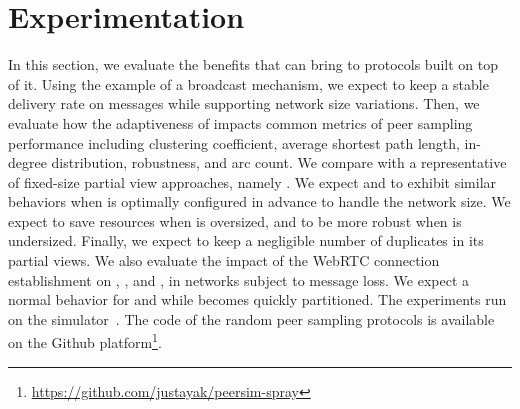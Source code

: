 \section{Experimentation}
\label{sec:experimentation}

In this section, we evaluate the benefits that \SPRAY can bring to
protocols built on top of it. Using the example of a broadcast
mechanism, we expect \SPRAY to keep a stable delivery rate on messages
while supporting network size variations. Then, we evaluate how the
adaptiveness of \SPRAY impacts common metrics of peer sampling
performance including clustering coefficient, average shortest path
length, in-degree distribution, robustness, and arc count. We compare \SPRAY with
a representative of fixed-size partial view approaches, namely
\CYCLON. We expect \SPRAY and \CYCLON to exhibit similar behaviors
when \CYCLON is optimally configured in advance to handle the network
size. We expect \SPRAY to save resources when \CYCLON is oversized,
and to be more robust when \CYCLON is undersized. Finally, we expect
\SPRAY to keep a negligible number of duplicates in its partial
views. We also evaluate the impact of the WebRTC connection establishment
on \CYCLON, \SCAMP, and \SPRAY, in  networks subject to message loss.
We expect a normal behavior for \CYCLON and \SPRAY while \SCAMP becomes
quickly partitioned.
The experiments run on the \PEERSIM
simulator~\cite{montresor2009peersim}. The code of the random peer
sampling protocols is available on the Github
platform\footnote{\url{https://github.com/justayak/peersim-spray}}.








